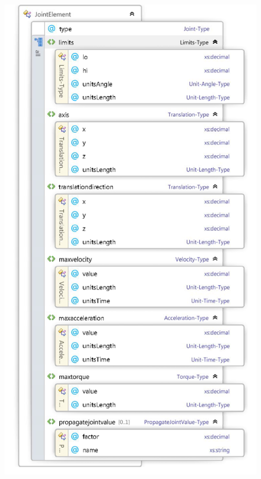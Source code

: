 \documentclass{book}
\begin{document}
\begin{figure}[H]
	\centering
	\includegraphics[scale = 0.3]{Xsd_Joint2}
\end{figure}
\end{document}
